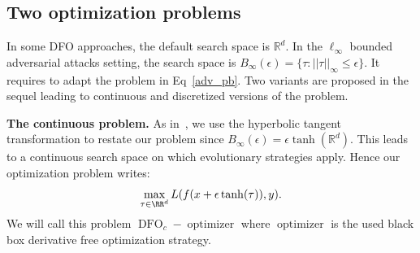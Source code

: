 \subsection{Two optimization problems}\label{top}
In some DFO approaches, the default search space is $\mathbb{R}^d$. In the $\ell_\infty$ bounded adversarial attacks setting, the search space is $B_\infty(\epsilon)=\{\tau:||\tau||_\infty\leq\epsilon\}$.  It requires to adapt the problem in Eq~\ref{adv_pb}. Two variants are proposed in the sequel leading to continuous and discretized versions of the problem.

\textbf{The continuous problem.} As in~\cite{carlini2017towards}, we use the hyperbolic tangent transformation to restate our problem since $B_\infty(\epsilon)= \epsilon\tanh{(\mathbb{R}^d)}$. This leads to a continuous search space on which evolutionary strategies apply. Hence our optimization problem writes:
\begin{equation}
    \max_{\tau\in \RR^d}L(f(x+\epsilon\tanh(\tau)),y).\label{eqcont}
\end{equation}
We will call this problem $\operatorname{DFO}_c-\operatorname{optimizer}$ where $\operatorname{optimizer}$ is the used black box derivative free optimization strategy.

